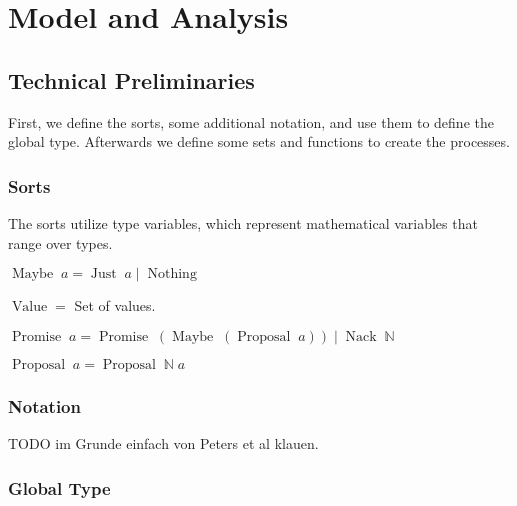 \chapter{Model and Analysis}

\section{Technical Preliminaries}
First, we define the sorts, some additional notation, and use them to define the global type.
Afterwards we define some sets and functions to create the processes.

\subsection{Sorts}
The sorts utilize type variables, which represent mathematical variables that range over types.

\newcommand{\Maybe}[1]{\operatorname{Maybe}\; #1}
\newcommand{\Just}[1]{\operatorname{Just}\; #1}
\newcommand{\Nothing}[0]{\operatorname{Nothing}}
\newcommand{\Or}[0]{\; | \;}
\newcommand{\Promise}[1]{\operatorname{Promise}\; #1}
\newcommand{\Proposal}[1]{\operatorname{Proposal}\; #1}
\newcommand{\ProposalC}[2]{\operatorname{Proposal}\; #1\; #2}
\newcommand{\Nack}[1]{\operatorname{Nack}\; #1}
\newcommand{\Value}[0]{\operatorname{Value}}

$\Maybe{a} = \Just{a} \Or \Nothing$

$\Value =$ Set of values.

$\Promise{a} = \Promise{\left(\Maybe{\left(\Proposal{a}\right)}\right)} \Or \Nack{\mathbb{N}}$

$\Proposal{a} = \ProposalC{\mathbb{N}}{a}$

\subsection{Notation}
TODO im Grunde einfach von Peters et al klauen.

\subsection{Global Type}
\newcommand{\DotForall}[1]{\bigodot_{#1}\;}
\newcommand{\SendUnreliableG}[4]{#1 \to_u #2 : #3 \left\langle #4 \right\rangle}
\newcommand{\SendWeaklyG}[3]{#1 \to_w #2 : #3}

\newcommand{\Accept}[0]{\mathnormal{Accept}}
\newcommand{\Restart}[0]{\mathnormal{Restart}}
\newcommand{\Abort}[0]{\mathnormal{Abort}}


